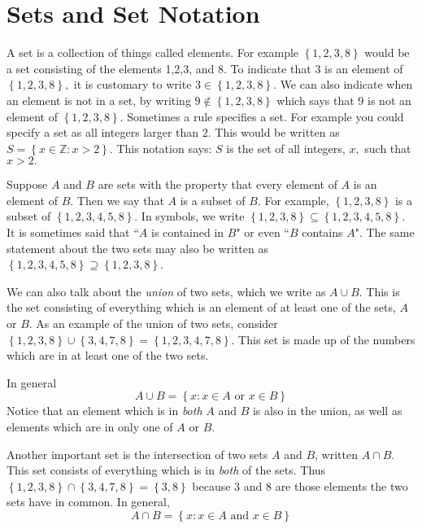 \section{Sets and Set Notation}

A set is a collection of things called elements.
For example $\left\{ 1,2,3,8\right\} $
would be a set consisting of the elements 1,2,3, and 8. To indicate that $3$
is an element of $\left\{ 1,2,3,8\right\} ,$ it is customary to write $3\in
\left\{ 1,2,3,8\right\} .$ We can also indicate when an element is not in a set, 
by writing $9\notin \left\{ 1,2,3,8\right\} $ which says that $9$ is
not an element of $\left\{ 1,2,3,8\right\} .$ Sometimes a rule specifies a
set. For example you could specify a set as all integers larger than $2.$
This would be written as $S=\left\{ x\in \mathbb{Z}:x>2\right\} .$ This
notation says: $S$ is the set of all integers, $x,$ such that $x>2.$

Suppose $A$ and $B$ are sets with the property that every element of $A$ is an
element of $B$. Then we say that $A$ is a subset of $B.$ For example, $\left\{
1,2,3,8\right\} $ is a subset of $\left\{ 1,2,3,4,5,8\right\}.$ In symbols, we write
$\left\{ 1,2,3,8\right\} \subseteq \left\{ 1,2,3,4,5,8\right\} .$ It is
sometimes said that ``$A$ is contained in $B$" or even ``$B$ contains $A$".
The same statement about the two sets may also be written as $\left\{
1,2,3,4,5,8\right\} \supseteq \left\{ 1,2,3,8\right\} $.

We can also talk about the {\em union\em} of two sets, which we write as $A \cup B$. This is the set consisting of everything which is an
element of at least one of the sets, $A$ or $B$. As an example of the union
of two sets, consider $\left\{ 1,2,3,8\right\} \cup \left\{ 3,4,7,8\right\} =\left\{
1,2,3,4,7,8\right\} $. This set is made up of the numbers which are in at least
one of the two sets.\index{$\cup$}

In general
\begin{equation*}
A\cup B = \left\{ x:x\in A
\text{ or }x\in B\right\} 
\end{equation*}
Notice that an element which is in {\em both\em} $A$ and $B$ is also in the
union, as well as elements which are in only one of $A$ or $B$. 

Another important set is the intersection\index{$\cap$} of two sets $A$ and $B$, written $A \cap B$. This set consists of everything which is in
{\em both\em} of the sets. Thus $\left\{ 1,2,3,8\right\} \cap \left\{ 3,4,7,8\right\}
=\left\{ 3,8\right\} $ because $3$ and $8$ are those elements the two sets
have in common. In general,
\begin{equation*}
A\cap B =  \left\{ x:x\in A\text{ and }x\in B\right\} 
\end{equation*}

